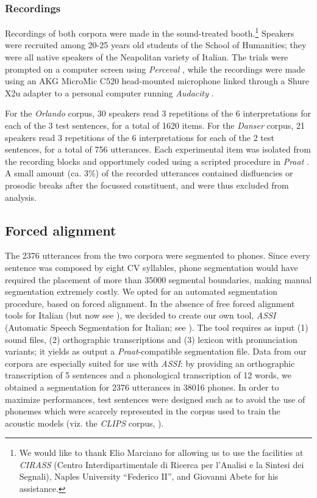\subsubsection{Recordings}\label{sec4213}
Recordings of both corpora were made in the sound-treated booth.\footnote{We would like to thank Elio Marciano for allowing us to use the facilities at \textit{CIRASS} (Centro Interdipartimentale di Ricerca per l'Analisi e la Sintesi dei Segnali), Naples University ``Federico II'', and Giovanni Abete for his assistance.} Speakers were recruited among 20-25 years old students of the School of Humanities; they were all native speakers of the Neapolitan variety of Italian. The trials were prompted on a computer screen using \textit{Perceval} \citep{andre2003perceval}, while the recordings were made using an AKG MicroMic C520 head-mounted microphone linked through a Shure X2u adapter to a personal computer running \textit{Audacity} \citep{audacity2006audacity}. 

For the \textit{Orlando} corpus, 30 speakers read 3 repetitions of the 6 interpretations for each of the 3 test sentences, for a total of 1620 items. For the \textit{Danser} corpus, 21 speakers read 3 repetitions of the 6 interpretations for each of the 2 test sentences, for a total of 756 utterances. Each experimental item was isolated from the recording blocks and opportunely coded using a scripted procedure in \textit{Praat} \citep{boersma2008praat}. A small amount (ca. 3\%) of the recorded utterances contained disfluencies or prosodic breaks after the focussed constituent, and were thus excluded from analysis. 

\subsection{Forced alignment}\label{sec422}
The 2376 utterances from the two corpora were segmented to phones. Since every sentence was composed by eight CV syllables, phone segmentation would have required the placement of more than 35000 segmental boundaries, making manual segmentation extremely costly. We opted for an automated segmentation procedure, based on forced alignment. In the absence of free forced alignment tools for Italian (but now see \citealt{bigi2012speech}), we decided to create our own tool, \textit{ASSI} (Automatic Speech Segmentation for Italian; see \citealt{cangemi2011automatic}). The tool requires as input (1) sound files, (2) orthographic transcriptions and (3) lexicon with pronunciation variants; it yields as output a \textit{Praat}-compatible segmentation file. Data from our corpora are especially suited for use with \textit{ASSI}: by providing an orthographic transcription of 5 sentences and a phonological transcription of 12 words, we obtained a segmentation for 2376 utterances in 38016 phones. In order to maximize performances, test sentences were designed such as to avoid the use of phonemes which were scarcely represented in the corpus used to train the acoustic models (viz. the \textit{CLIPS} corpus, \citealt{savy2009clips}). 

